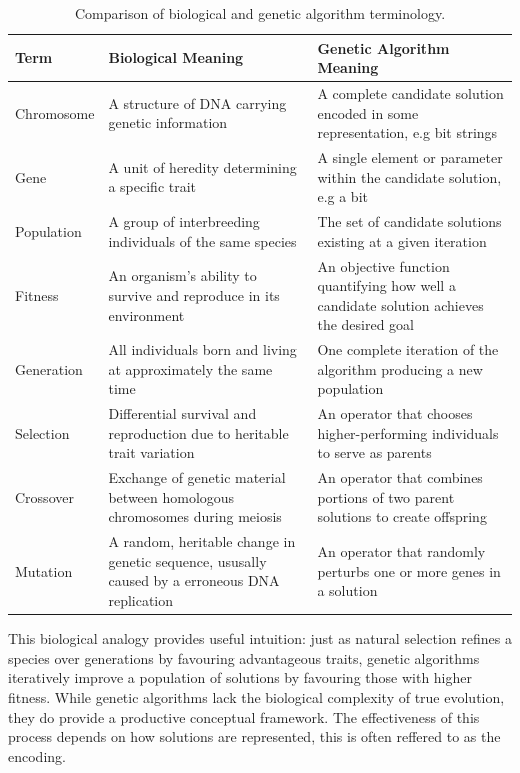 \begin{table}[h]
\centering
\caption{Comparison of biological and genetic algorithm terminology.}
\begin{tabularx}{\textwidth}{l X X}
\toprule 
Term & Biological Meaning & Genetic Algorithm Meaning \\
\midrule 
Chromosome & A structure of \gls{DNA} carrying genetic information & A complete candidate solution encoded in some representation, e.g bit strings \\
Gene & A unit of heredity determining a specific trait & A single element or parameter within the candidate solution, e.g a bit \\
Population & A group of interbreeding individuals of the same species & The set of candidate solutions existing at a given iteration \\
Fitness & An organism's ability to survive and reproduce in its environment & An objective function quantifying how well a candidate solution achieves the desired goal \\
Generation & All individuals born and living at approximately the same time & One complete iteration of the algorithm producing a new population \\
Selection & Differential survival and reproduction due to heritable trait variation & An operator that chooses higher-performing individuals to serve as parents \\
Crossover & Exchange of genetic material between homologous chromosomes during meiosis & An operator that combines portions of two parent solutions to create offspring \\
Mutation & A random, heritable change in genetic sequence, ususally caused by a erroneous \gls{DNA} replication & An operator that randomly perturbs one or more genes in a solution \\
\bottomrule
\end{tabularx}
\label{tab:ga-terminology}
\end{table}

This biological analogy provides useful intuition: just as natural selection refines a species over generations by favouring advantageous traits, genetic algorithms iteratively improve a population of solutions by favouring those with higher fitness. While genetic algorithms lack the biological complexity of true evolution, they do provide a productive conceptual framework. The effectiveness of this process depends on how solutions are represented, this is often reffered to as the encoding.

